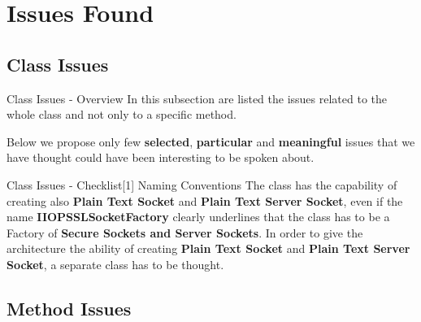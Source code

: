 \documentclass{../common/latex_classes/pdf_presentation}
\begin{document}
	\section{Issues Found}
	
	\subsection{Class Issues}
	
	\begin{frame}{Class Issues - Overview}
		In this subsection are listed the issues related to the whole class and not only to a specific method. \par Below we propose only few \textbf{selected}, \textbf{particular} and \textbf{meaningful} issues that we have thought could have been interesting to be spoken about.
	\end{frame}
	\begin{frame}{Class Issues - Checklist[1] Naming Conventions}
		The class has the capability of creating also \textbf{Plain Text Socket} and \textbf{Plain Text Server Socket}, even if the name \textbf{IIOPSSLSocketFactory} clearly underlines that the class has to be a Factory of \textbf{Secure Sockets and Server Sockets}. In order to give the architecture the ability of creating \textbf{Plain Text Socket} and \textbf{Plain Text Server Socket}, a separate class has to be thought.
	\end{frame}
	\subsection{Method Issues}
	
\end{document}
